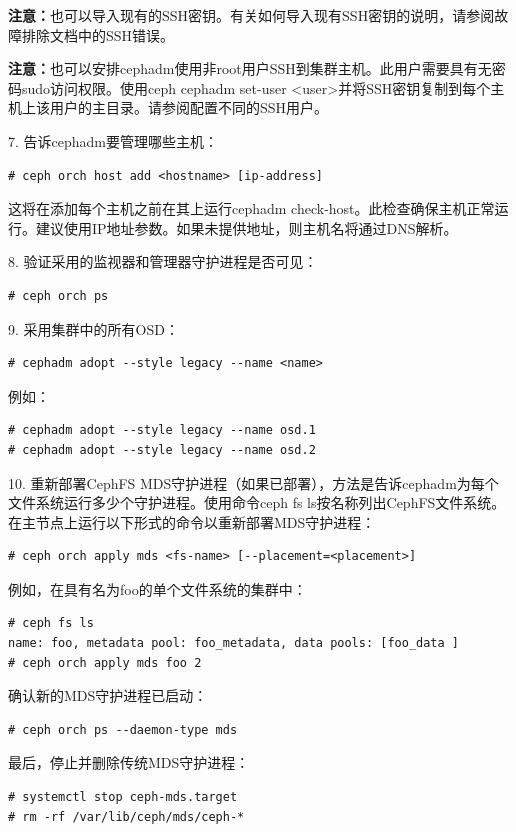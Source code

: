 \documentclass[12pt,UTF8]{ctexbook}
\begin{document}
\textbf{注意：}也可以导入现有的SSH密钥。有关如何导入现有SSH密钥的说明，请参阅故障排除文档中的SSH错误。

\textbf{注意：}也可以安排cephadm使用非root用户SSH到集群主机。此用户需要具有无密码sudo访问权限。使用ceph cephadm set-user <user>并将SSH密钥复制到每个主机上该用户的主目录。请参阅配置不同的SSH用户。

7. 告诉cephadm要管理哪些主机：
\begin{verbatim}
# ceph orch host add <hostname> [ip-address]
\end{verbatim}

这将在添加每个主机之前在其上运行cephadm check-host。此检查确保主机正常运行。建议使用IP地址参数。如果未提供地址，则主机名将通过DNS解析。

8. 验证采用的监视器和管理器守护进程是否可见：
\begin{verbatim}
# ceph orch ps
\end{verbatim}

9. 采用集群中的所有OSD：
\begin{verbatim}
# cephadm adopt --style legacy --name <name>
\end{verbatim}

例如：
\begin{verbatim}
# cephadm adopt --style legacy --name osd.1
# cephadm adopt --style legacy --name osd.2
\end{verbatim}

10. 重新部署CephFS MDS守护进程（如果已部署），方法是告诉cephadm为每个文件系统运行多少个守护进程。使用命令ceph fs ls按名称列出CephFS文件系统。在主节点上运行以下形式的命令以重新部署MDS守护进程：
\begin{verbatim}
# ceph orch apply mds <fs-name> [--placement=<placement>]
\end{verbatim}

例如，在具有名为foo的单个文件系统的集群中：
\begin{verbatim}
# ceph fs ls
name: foo, metadata pool: foo_metadata, data pools: [foo_data ]
# ceph orch apply mds foo 2
\end{verbatim}

确认新的MDS守护进程已启动：
\begin{verbatim}
# ceph orch ps --daemon-type mds
\end{verbatim}

最后，停止并删除传统MDS守护进程：
\begin{verbatim}
# systemctl stop ceph-mds.target
# rm -rf /var/lib/ceph/mds/ceph-*
\end{verbatim}
\end{document}
